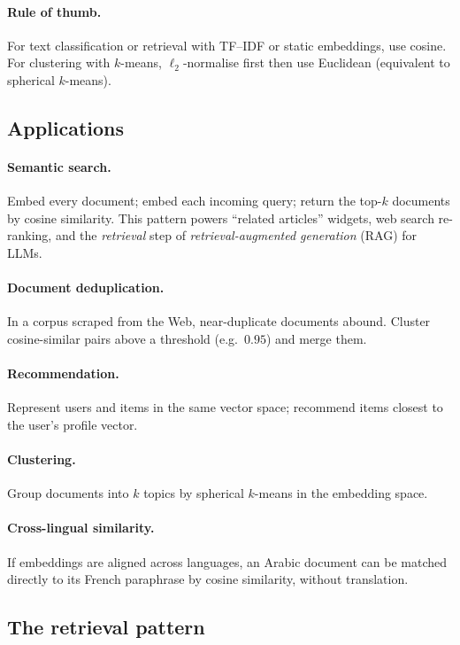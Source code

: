 \documentclass[12pt,a4paper]{report}
\theoremstyle{definition}
\theoremstyle{remark}
\begin{document}
\paragraph{Rule of thumb.} For text classification or retrieval with TF--IDF or static embeddings, use cosine. For clustering with $k$-means, $\ell_2$-normalise first then use Euclidean (equivalent to spherical $k$-means).

\subsection{Applications}

\paragraph{Semantic search.} Embed every document; embed each incoming query; return the top-$k$ documents by cosine similarity. This pattern powers ``related articles'' widgets, web search re-ranking, and the \emph{retrieval} step of \emph{retrieval-augmented generation} (RAG) for LLMs.

\paragraph{Document deduplication.} In a corpus scraped from the Web, near-duplicate documents abound. Cluster cosine-similar pairs above a threshold (e.g.\ $0.95$) and merge them.

\paragraph{Recommendation.} Represent users and items in the same vector space; recommend items closest to the user's profile vector.

\paragraph{Clustering.} Group documents into $k$ topics by spherical $k$-means in the embedding space.

\paragraph{Cross-lingual similarity.} If embeddings are aligned across languages, an Arabic document can be matched directly to its French paraphrase by cosine similarity, without translation.

\subsection{The retrieval pattern}
\end{document}
